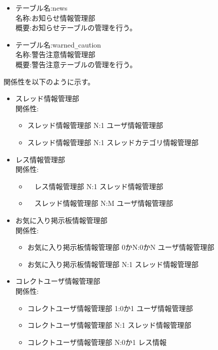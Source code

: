 \documentclass[a4j]{jarticle}
\begin{document}
\begin{itemize}
  \item テーブル名:news\\
    名称:お知らせ情報管理部\\
    概要:お知らせテーブルの管理を行う。
    
  \item テーブル名:warned\verb|_|caution\\
    名称:警告注意情報管理部\\
    概要:警告注意テーブルの管理を行う。

  \end{itemize}
  関係性を以下のように示す。
  \begin{itemize}
  \item スレッド情報管理部\\
    関係性:
    
    \begin{itemize}
    \item スレッド情報管理部 N:1 ユーザ情報管理部
    \item スレッド情報管理部 N:1 スレッドカテゴリ情報管理部 
    \end{itemize}

  \item レス情報管理部\\
    関係性:
    
    \begin{itemize}
    \item　レス情報管理部 N:1 スレッド情報管理部
    \item　スレッド情報管理部 N:M ユーザ情報管理部 
    \end{itemize}

  \item お気に入り掲示板情報管理部\\
    関係性:
    
    \begin{itemize}
    \item お気に入り掲示板情報管理部 0かN:0かN ユーザ情報管理部
    \item お気に入り掲示板情報管理部 N:1 スレッド情報管理部 
    \end{itemize}
  \item コレクトユーザ情報管理部\\
    関係性:
    
    \begin{itemize}
    \item コレクトユーザ情報管理部 1:0か1 ユーザ情報管理部
    \item コレクトユーザ情報管理部 N:1 スレッド情報管理部
    \item コレクトユーザ情報管理部 N:0か1 レス情報  
    \end{itemize}
    

\end{itemize}
\end{document}
